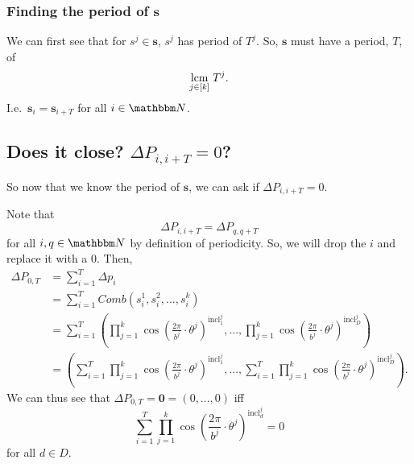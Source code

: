 \documentclass[11pt,titlepage]{article}
\newcommand{\statePeriod}{T^j}
\newcommand{\stateNotime}[1]{s^{#1}}
\newcommand{\totalPeriod}{T}
\newcommand{\totalStateNotime}{\pmb{s}}
\newcommand{\combWithState}[1]{Comb\left(s^1_{#1}, s^2_{#1}, ..., s^k_{#1}\right)}
\newcommand{\inclIndic}[2]{{\mathrm{incl}_{#1}^{#2}}}
\newcommand{\numbToAngle}{\frac{2\pi}{b^j}}
\newcommand{\combSingleTerm}[1]{\prod_{j=1}^k \cos\left(\numbToAngle \cdot \theta^j\right) ^ {\inclIndic{#1}{j}}}
\begin{document}
\subsubsection{Finding the period of $\pmb{s}$}
We can first see that for $\stateNotime{j} \in \pmb{s}$, $\stateNotime{j}$
has period of $\statePeriod$. So, $\pmb{s}$ must have a period, $\totalPeriod$, of
$$
\underset{j \in [k]}{\operatorname{lcm}}\; T^j.
$$
I.e.\ $\pmb{s}_i = \pmb{s}_{i + T}$ for all $i \in \N$.







\subsection{Does it close? $\Delta P_{i, i + T} = 0$?}
So now that we know the period of $\totalStateNotime$, we can ask if
$\Delta P_{i, i + T} = 0$. %

Note that 
$$
\Delta P_{i, i + T} = \Delta P_{q, q + T}
$$
for all $i, q \in \N$ by definition of periodicity.
So, we will drop the $i$ and replace it with a $0$.
Then,
\begin{align*}
  \Delta P_{0, T} &= \sum_{i = 1}^T \Delta p_i \\
  &= \sum_{i = 1}^T \combWithState{i} \\
  &= \sum_{i = 1}^T \left(\combSingleTerm{1}, ..., \combSingleTerm{D}\right) \\
  &= \left(\sum_{i = 1}^T \combSingleTerm{1}, ..., \sum_{i = 1}^T \combSingleTerm{D}\right).
\end{align*}
We can thus see that $\Delta P_{0, T} = \pmb{0} = (0, ..., 0)$ iff 
\begin{equation}
\label{eq:singleDelta0}
\sum_{i = 1}^T \combSingleTerm{d} = 0
\end{equation}
for all $d \in D$.
\end{document}
